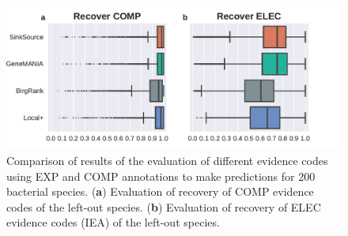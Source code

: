 \begin{figure}[H]
    \centering
    \includegraphics[width=\textwidth]{figs/s200-eval-comp-iea-fmax-boxplots-bp-0_95.pdf}
    \caption{
      Comparison of \fmax results of the \loso evaluation of different evidence codes using EXP and COMP annotations to make predictions for 200 bacterial species. 
      (\textbf{a}) Evaluation of recovery of COMP evidence codes of the left-out species.
      (\textbf{b}) Evaluation of recovery of ELEC evidence codes (IEA) of the left-out species.
    }
    \label{fig:s200-loso-results-expc-comp}
\end{figure}
